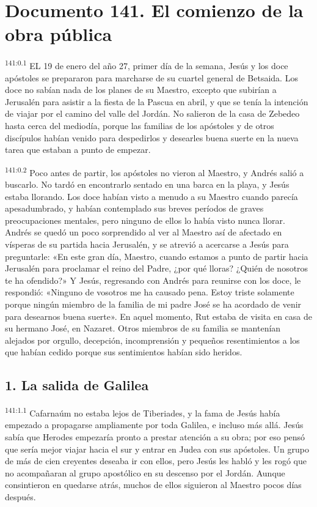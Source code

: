 \chapter{Documento 141. El comienzo de la obra pública}
\par
\textsuperscript{141:0.1} EL 19 de enero del año 27, primer día de la semana, Jesús y los doce apóstoles se prepararon para marcharse de su cuartel general de Betsaida. Los doce no sabían nada de los planes de su Maestro, excepto que subirían a Jerusalén para asistir a la fiesta de la Pascua en abril, y que se tenía la intención de viajar por el camino del valle del Jordán. No salieron de la casa de Zebedeo hasta cerca del mediodía, porque las familias de los apóstoles y de otros discípulos habían venido para despedirlos y desearles buena suerte en la nueva tarea que estaban a punto de empezar.

\par
\textsuperscript{141:0.2} Poco antes de partir, los apóstoles no vieron al Maestro, y Andrés salió a buscarlo. No tardó en encontrarlo sentado en una barca en la playa, y Jesús estaba llorando. Los doce habían visto a menudo a su Maestro cuando parecía apesadumbrado, y habían contemplado sus breves períodos de graves preocupaciones mentales, pero ninguno de ellos lo había visto nunca llorar. Andrés se quedó un poco sorprendido al ver al Maestro así de afectado en vísperas de su partida hacia Jerusalén, y se atrevió a acercarse a Jesús para preguntarle: «En este gran día, Maestro, cuando estamos a punto de partir hacia Jerusalén para proclamar el reino del Padre, ¿por qué lloras? ¿Quién de nosotros te ha ofendido?» Y Jesús, regresando con Andrés para reunirse con los doce, le respondió: «Ninguno de vosotros me ha causado pena. Estoy triste solamente porque ningún miembro de la familia de mi padre José se ha acordado de venir para desearnos buena suerte». En aquel momento, Rut estaba de visita en casa de su hermano José, en Nazaret. Otros miembros de su familia se mantenían alejados por orgullo, decepción, incomprensión y pequeños resentimientos a los que habían cedido porque sus sentimientos habían sido heridos.

\section*{1. La salida de Galilea}
\par
\textsuperscript{141:1.1} Cafarnaúm no estaba lejos de Tiberiades, y la fama de Jesús había empezado a propagarse ampliamente por toda Galilea, e incluso más allá. Jesús sabía que Herodes empezaría pronto a prestar atención a su obra; por eso pensó que sería mejor viajar hacia el sur y entrar en Judea con sus apóstoles. Un grupo de más de cien creyentes deseaba ir con ellos, pero Jesús les habló y les rogó que no acompañaran al grupo apostólico en su descenso por el Jordán. Aunque consintieron en quedarse atrás, muchos de ellos siguieron al Maestro pocos días después.

